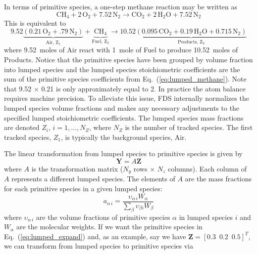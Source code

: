 In terms of primitive species, a one-step methane reaction may be written as
\begin{equation}\label{eq:lumped_methane}
\mbox{CH}_4 + 2\, \mbox{O}_2+7.52\,\mbox{N}_2 \rightarrow \mbox{CO}_2+2\,\mbox{H}_2\mbox{O}+7.52\,\mbox{N}_2
\end{equation}
This is equivalent to
\begin{equation}\label{eq:lumped_expand}
\mathrm{9.52\underbrace{(0.21\,\mbox{O}_2+.79\,\mbox{N}_2)}_\text{Air, $Z_1$} + \underbrace{ \mbox{CH}_4}_\text{Fuel,~$Z_2$} \rightarrow 10.52\underbrace{(0.095\,\mbox{CO}_2+0.19\,\mbox{H}_2\mbox{O}+0.715\,\mbox{N}_2)}_\text{Products,~$Z_3$}}
\end{equation}
where 9.52~moles of Air react with 1~mole of Fuel to produce 10.52~moles of Products. Notice that the primitive species have been grouped by volume fraction into lumped species and the lumped species stoichiometric coefficients are the sum of the primitive species coefficients from Eq.~(\ref{eq:lumped_methane}). Note that 9.52 $\times$ 0.21 is only approximately equal to 2. In practice the atom balance requires machine precision. To alleviate this issue, FDS internally normalizes the lumped species volume fractions and makes any necessary adjustments to the specified lumped stoichiometric coefficients. The lumped species mass fractions are denoted $Z_i$, $i=1,...,N_Z$, where $N_Z$ is the number of tracked species. The first tracked species, $Z_1$, is typically the background species, Air.

The linear transformation from lumped species to primitive species is given by
\begin{equation}\label{eq:transform}
\textbf{Y}=A\textbf{Z}
\end{equation}
where $A$ is the transformation matrix ($N_{y}$ rows $\times$ $N_{z}$ columns).  Each column of $A$ represents a different lumped species.  The elements of $A$ are the mass fractions for each primitive species in a given lumped species:
\begin{equation}\label{eq:A_def}
a_{\alpha\,i} = \frac{\upsilon_{\alpha\,i}W_{\alpha}}{\displaystyle \sum_{\beta}\upsilon_{\beta i}W_{\beta}}
\end{equation}
where $\upsilon_{\alpha\,i}$ are the volume fractions of primitive species $\alpha$ in lumped species $i$ and $W_\alpha$ are the molecular weights. If we want the primitive species in Eq.~(\ref{eq:lumped_expand}) and, as an example, say we have $\mathbf{Z} = [0.3 \,\,\, 0.2 \,\,\, 0.5]^T$, we can transform from lumped species to primitive species via

